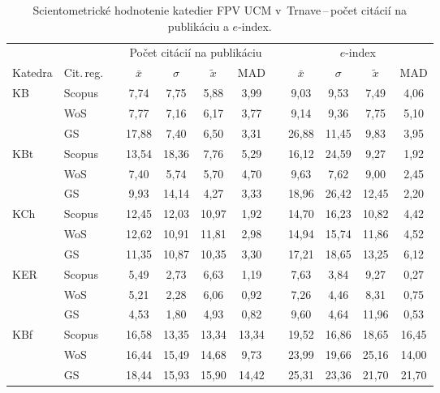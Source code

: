 \begin{table}
  \centering\small
  \caption[Hodnotenie FPV\,--\,počet citácií na publikáciu a $e$-index]%
  {Scientometrické hodnotenie katedier FPV UCM v~Trnave\,--\,počet citácií na
    publikáciu a $e$-index.}
  \label{tab:2-staff.results}
  \begin{tabularx}{\textwidth}{XXp{1ex}ccccp{1ex}cccc}
    \toprule
    & & &\multicolumn{4}{c}{Počet citácií na publikáciu} & &\multicolumn{4}{c}{$e$-index} \\
    \cmidrule{4-7}\cmidrule{9-12}
    Katedra  & Cit.\,reg. & & $\bar{x}$ & $\sigma$  & $\tilde{x}$ & MAD & & $\bar{x}$ & $\sigma$ & $\tilde{x}$  & MAD \\
    \midrule
    KB   & Scopus & & 7,74  & 7,75  & 5,88  & 3,99  & & 9,03  & 9,53  & 7,49  & 4,06  \\
         & WoS    & & 7,77  & 7,16  & 6,17  & 3,77  & & 9,14  & 9,36  & 7,75  & 5,10  \\
         & GS     & & 17,88 & 7,40  & 6,50  & 3,31  & & 26,88 & 11,45 & 9,83  & 3,95  \\[1ex]
    KBt  & Scopus & & 13,54 & 18,36 & 7,76  & 5,29  & & 16,12 & 24,59 & 9,27  & 1,92  \\
         & WoS    & & 7,40  & 5,74  & 5,70  & 4,70  & & 9,63  & 7,62  & 9,00  & 2,45  \\
         & GS     & & 9,93  & 14,14 & 4,27  & 3,33  & & 18,96 & 26,42 & 12,45 & 2,20  \\[1ex]
    KCh  & Scopus & & 12,45 & 12,03 & 10,97 & 1,92  & & 14,70 & 16,23 & 10,82 & 4,42  \\
         & WoS    & & 12,62 & 10,91 & 11,81 & 2,98  & & 14,94 & 15,74 & 11,86 & 4,52  \\
         & GS     & & 11,35 & 10,87 & 10,35 & 3,30  & & 17,21 & 18,65 & 13,25 & 6,12  \\[1ex]
    KER  & Scopus & & 5,49  & 2,73  & 6,63  & 1,19  & & 7,63  & 3,84  & 9,27  & 0,27  \\
         & WoS    & & 5,21  & 2,28  & 6,06  & 0,92  & & 7,26  & 4,46  & 8,31  & 0,75  \\
         & GS     & & 4,53  & 1,80  & 4,93  & 0,82  & & 9,60  & 4,64  & 11,96 & 0,53  \\[1ex]
    KBf  & Scopus & & 16,58 & 13,35 & 13,34 & 13,34 & & 19,52 & 16,86 & 18,65 & 16,45 \\
         & WoS    & & 16,44 & 15,49 & 14,68 & 9,73  & & 23,99 & 19,66 & 25,16 & 14,00 \\
         & GS     & & 18,44 & 15,93 & 15,90 & 14,42 & & 25,31 & 23,36 & 21,70 & 21,70 \\[1ex]

\end{tabularx}
\end{table}
